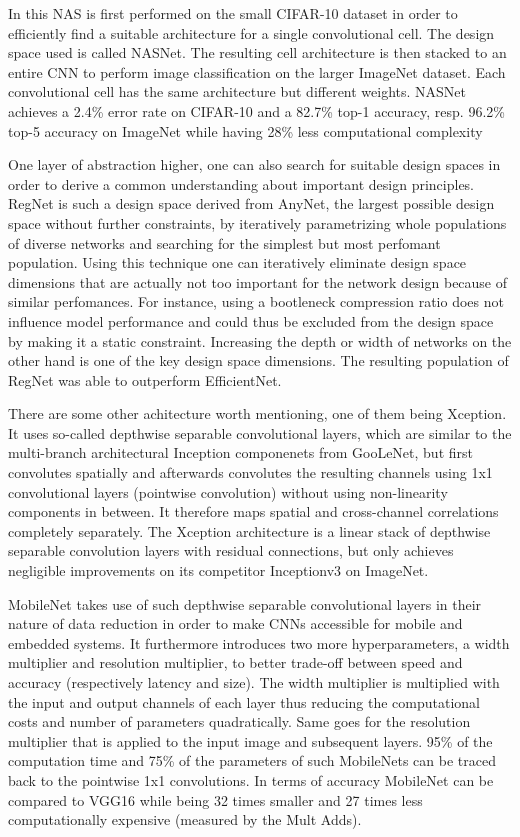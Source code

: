 In \cite{BarretZoph.2018} this NAS is first performed on the small CIFAR-10 dataset in order to efficiently find a suitable architecture for a single convolutional cell. The design space used is called NASNet. The resulting cell architecture is then stacked to an entire CNN to perform image classification on the larger ImageNet dataset. Each convolutional cell has the same architecture but different weights. NASNet achieves a 2.4\% error rate on CIFAR-10 and a 82.7\% top-1 accuracy, resp. 96.2\% top-5 accuracy on ImageNet while having 28\% less computational complexity

One layer of abstraction higher, one can also search for suitable design spaces in order to derive a common understanding about important design principles. RegNet is such a design space derived from AnyNet, the largest possible design space without further constraints, by iteratively parametrizing whole populations of diverse networks and searching for the simplest but most perfomant population. Using this technique one can iteratively eliminate design space dimensions that are actually not too important for the network design because of similar perfomances. For instance, using a bootleneck compression ratio does not influence model performance and could thus be excluded from the design space by making it a static constraint. Increasing the depth or width of networks on the other hand is one of the key design space dimensions. The resulting population of RegNet was able to outperform EfficientNet. \cite{IlijaRadosavovic.2020}

There are some other achitecture worth mentioning, one of them being Xception. It uses so-called depthwise separable convolutional layers, which are similar to the  multi-branch architectural Inception componenets from GooLeNet, but first convolutes spatially and afterwards convolutes the resulting channels using 1x1 convolutional layers (pointwise convolution) without using non-linearity components in between. It therefore maps spatial and cross-channel correlations completely separately. The Xception architecture is a linear stack of depthwise separable convolution layers with residual connections, but only achieves negligible improvements on its competitor Inceptionv3 on ImageNet. \cite{FrancoisChollet.2017}

MobileNet takes use of such depthwise separable convolutional layers in their nature of data reduction in order to make CNNs accessible for mobile and embedded systems. It furthermore introduces two more hyperparameters, a width multiplier and resolution multiplier, to better trade-off between speed and accuracy (respectively latency and size). The width multiplier is multiplied with the input and output channels of each layer thus reducing the computational costs and number of parameters quadratically. Same goes for the resolution multiplier that is applied to the input image and subsequent layers. 95\% of the computation time and 75\% of the parameters of such MobileNets can be traced back to the pointwise 1x1 convolutions. In terms of accuracy MobileNet can be compared to VGG16 while being 32 times smaller and 27 times less computationally expensive (measured by the Mult Adds). \cite{AndrewGHoward.2017}

